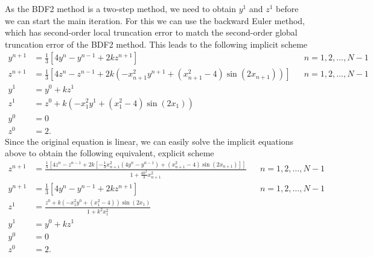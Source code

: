 \documentclass{homework}
\begin{document}
	\begin{alphaparts}
		\questionpart As the BDF2 method is a two-step method, we need to obtain $y^1$ and $z^1$ before we can start the main iteration. For this we can use the backward Euler method, which has second-order local truncation error to match the second-order global truncation error of the BDF2 method. This leads to the following implicit scheme
		\begin{align*}
			y^{n+1} &= \frac{1}{3}\left[4y^n - y^{n-1} + 2kz^{n+1}\right] && n =1,2,\dots, N-1\\
			z^{n+1} &= \frac{1}{3}\left[4z^n - z^{n-1} +2k(-x_{n+1}^2y^{n+1} + (x_{n+1}^2 - 4)\sin(2x_{n+1}))\right]&& n=1,2,\dots,N-1 \\
			y^1 &= y^0 + kz^1 \\
			z^1 &= z^0 + k(-x_1^2y^1 + (x_1^2 -4)\sin(2x_1)) \\
			y^0 &= 0 \\
			z^0 &= 2.
		\end{align*}
		Since the original equation is linear, we can easily solve the implicit equations above to obtain the following equivalent, explicit scheme
		\begin{align*}
			z^{n+1} &= \frac{\frac{1}{3}\left[4z^n - z^{n-1} + 2k\left[-\frac{1}{3}x_{n+1}^2(4y^n - y^{n-1}) + (x_{n+1}^2 - 4)\sin(2x_{n+1})\right]\right]}{1 + \frac{4k^2}{3}x_{n+1}^2} && n = 1,2,\dots,N-1\\
			y^{n+1} &= \frac{1}{3}\left[4y^n - y^{n-1} + 2kz^{n+1}\right] && n =1,2,\dots, N-1\\
			z^1 &= \frac{z^0 + k(-x_1^2y^0 + (x_1^2-4))\sin(2x_1)}{1 + k^2x_1^2} \\
			y^1 &= y^0 + kz^1 \\
			y^0 &= 0 \\
			z^0 &= 2.
		\end{align*}
		\questionpart
		

\end{alphaparts}
\end{document}

